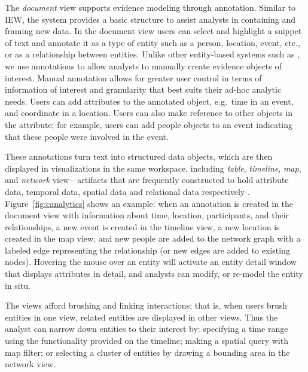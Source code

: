 The \emph{document} view supports evidence modeling through annotation. Similar to IEW, the system provides a basic structure to assist analysts in containing and framing new data. In the
document view users can select and highlight a snippet of text and
annotate it as a type of entity such as a person, location, event, etc.,
or as a relationship between entities. Unlike other entity-based
systems such as \cite{Bier2010,Stasko2008}, we use annotations to
allow analysts to manually create evidence objects of interest. Manual
annotation allows for greater user control in terms of
information of interest and granularity that best suits their ad-hoc
analytic needs.
Users can add attributes to the annotated object, e.g.~time in an event, and coordinate in a location. Users can
also make reference to other objects in the attribute; for example,
users can add people objects to an event indicating that these people
were involved in the event.

These annotations turn text into structured data objects, which are then displayed in visualizations in the same workspace, including \emph{table}, \emph{timeline}, \emph{map},
and \emph{network} view---artifacts that are frequently constructed to hold attribute
data, temporal data, spatial data and relational data respectively
\cite{Carroll2013}. Figure~\ref{fig:canalytics} shows an example:
when an annotation is created in the document view with information
about time, location, participants, and their relationships, a new event
is created in the timeline view, a new location is created in the map
view, and new people are added to the network graph with a labeled edge
representing the relationship (or new edges are added to existing
nodes). Hovering the mouse over an entity will activate an entity detail
window that displays attributes in detail, and analysts can modify, or
re-model the entity in situ.

The views afford brushing and linking interactions;
that is, when users brush entities in one view, related
entities are displayed in other views. Thus the analyst can narrow down
entities to their interest by: specifying a time range using the functionality provided on the timeline; making a spatial query
with map filter; or selecting a cluster of entities by drawing a bounding
area in the network view.

